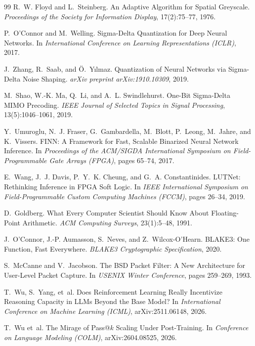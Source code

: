 \documentclass[10pt, twocolumn, a4paper]{article}
\begin{document}
\begin{thebibliography}{99}
R.~W. Floyd and L.~Steinberg.
\newblock An Adaptive Algorithm for Spatial Greyscale.
\newblock \emph{Proceedings of the Society for Information Display}, 17(2):75--77, 1976.

P.~O'Connor and M.~Welling.
\newblock Sigma-Delta Quantization for Deep Neural Networks.
\newblock In \emph{International Conference on Learning Representations (ICLR)}, 2017.

J.~Zhang, R.~Saab, and {\"O}.~Y{\i}lmaz.
\newblock Quantization of Neural Networks via Sigma-Delta Noise Shaping.
\newblock \emph{arXiv preprint arXiv:1910.10309}, 2019.

M.~Shao, W.-K. Ma, Q.~Li, and A.~L. Swindlehurst.
\newblock One-Bit Sigma-Delta MIMO Precoding.
\newblock \emph{IEEE Journal of Selected Topics in Signal Processing}, 13(5):1046--1061, 2019.

Y.~Umuroglu, N.~J. Fraser, G.~Gambardella, M.~Blott, P.~Leong, M.~Jahre, and K.~Vissers.
\newblock FINN: A Framework for Fast, Scalable Binarized Neural Network Inference.
\newblock In \emph{Proceedings of the ACM/SIGDA International Symposium on Field-Programmable Gate Arrays (FPGA)}, pages 65--74, 2017.

E.~Wang, J.~J. Davis, P.~Y.~K. Cheung, and G.~A. Constantinides.
\newblock LUTNet: Rethinking Inference in FPGA Soft Logic.
\newblock In \emph{IEEE International Symposium on Field-Programmable Custom Computing Machines (FCCM)}, pages 26--34, 2019.

D.~Goldberg.
\newblock What Every Computer Scientist Should Know About Floating-Point Arithmetic.
\newblock \emph{ACM Computing Surveys}, 23(1):5--48, 1991.

J.~O'Connor, J.-P. Aumasson, S.~Neves, and Z.~Wilcox-O'Hearn.
\newblock BLAKE3: One Function, Fast Everywhere.
\newblock \emph{BLAKE3 Cryptographic Specification}, 2020.

S.~McCanne and V.~Jacobson.
\newblock The BSD Packet Filter: A New Architecture for User-Level Packet Capture.
\newblock In \emph{USENIX Winter Conference}, pages 259--269, 1993.

T.~Wu, S.~Yang, et~al.
\newblock Does Reinforcement Learning Really Incentivize Reasoning Capacity in LLMs Beyond the Base Model?
\newblock In \emph{International Conference on Machine Learning (ICML)}, arXiv:2511.06148, 2026.

T.~Wu et~al.
\newblock The Mirage of Pass@$k$ Scaling Under Post-Training.
\newblock In \emph{Conference on Language Modeling (COLM)}, arXiv:2604.08525, 2026.

\end{thebibliography}
\end{document}

